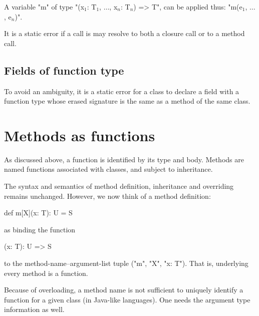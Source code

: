 A variable \xcd"m" of type
\xcdmath"(x$_1$: T$_1$, $\dots$, x$_n$: T$_n$) => T",
can be applied thus:
\xcdmath"m(e$_1$, $\dots$, e$_n$)".

It is a static error if a call is may resolve to both a closure call or
to a method call.


\subsection{Fields of function type}

To avoid an ambiguity, it is a static error for a class to declare a
field with a function type whose erased signature is the same as a
method of the same class.

\section{Methods as functions}

As discussed above, a function is identified by its type and body.
Methods are named functions associated with classes, and subject to
inheritance.

The syntax and semantics of method definition, inheritance and
overriding remains unchanged. However, we now think of a method definition:

\begin{grammar}
def m[X](x: T): U = { S }
\end{grammar}

as binding the function

\begin{xten}
[X](x: T): U => { S }
\end{xten}

to the method-name--argument-list tuple (\xcd"m", \xcd"X",
\xcd"x: T").  That is, underlying every method is a function.

\begin{note}
Because of overloading, a method name is not sufficient to
uniquely identify a function for a given class (in Java-like languages).
One needs the argument type information as well.
\end{note}

